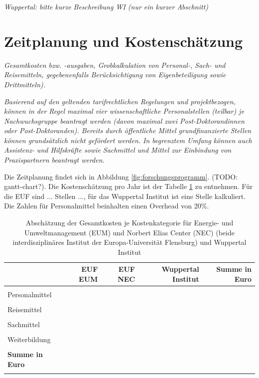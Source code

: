 \documentclass[a4paper,11pt,twoside]{scrartcl}
\begin{document}
\textit{Wuppertal: bitte kurze Beschreibung WI (nur ein kurzer Abschnitt)}


\section{Zeitplanung und Kostenschätzung}
\textit{Gesamtkosten bzw. -ausgaben, Grobkalkulation von Personal-, Sach- und Reisemitteln, gegebenenfalls Berücksichtigung von Eigenbeteiligung sowie Drittmitteln).}

\textit{Basierend auf den geltenden tarifrechtlichen Regelungen und projektbezogen, können in der Regel maximal vier wissenschaftliche Personalstellen (teilbar) je Nachwuchsgruppe beantragt werden (davon maximal zwei Post-Doktorandinnen oder Post-Doktoranden). Bereits durch öffentliche Mittel grundfinanzierte Stellen können grundsätzlich nicht gefördert werden.
In begrenztem Umfang können auch Assistenz- und Hilfskräfte sowie Sachmittel und Mittel zur Einbindung von Praxispartnern beantragt werden.}

Die Zeitplanung findet sich in Abbildung \ref{fig:forschungsprogramm}. (TODO: gantt-chart?). Die Kostenschätzung pro Jahr ist der Tabelle \ref{tab:kostenkalkulation} zu entnehmen. Für die EUF sind ... Stellen ..., für das Wuppertal Institut ist eine Stelle kalkuliert. Die Zahlen für Personalmittel beinhalten einen Overhead von 20\%.


\begin{table}[h]
\begin{center}
  \caption{Abschätzung der Gesamtkosten je Kostenkategorie für Energie- und Umweltmanagement (EUM) und Norbert Elias Center (NEC) (beide interdisziplinäres Institut der Europa-Universität Flensburg) und Wuppertal Institut}
\begin{tabular}[h]{l | rrr | r}
& EUF EUM & EUF NEC & Wuppertal Institut & \textbf{Summe in Euro}\\
\hline
\hline
&&&&\\
 Personalmittel & & & & \\
 \hline
 &&&&\\
 Reisemittel & & & & \\
 \hline
 &&&&\\
 Sachmittel & & & & \\
 \hline
 &&&&&\\
 Weiterbildung & &  & &\\
 \hline
 \hline
 &&&&\\
 \textbf{Summe in Euro}&& \textbf{}&\textbf{}&\underline{\textbf{}}\\
 \label{tab:kostenkalkulation}
\end{tabular}
\end{center}
\end{table}
\end{document}
